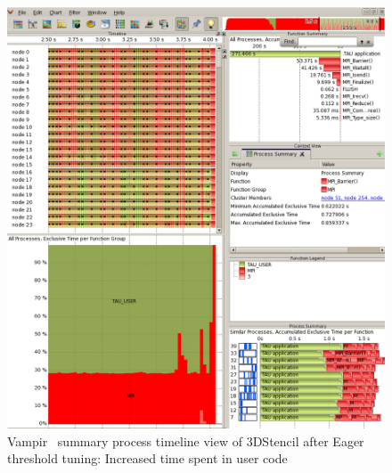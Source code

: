  \begin{figure}[tbp!]
  \centering
  \captionsetup{justification=centering}
  \includegraphics[scale=1.0,width=\columnwidth,keepaspectratio]{figures/Overlap-after}
         \caption{Vampir~\cite{Vampir} summary process timeline view of 3DStencil after Eager threshold tuning: Increased time spent in user code}
 \label{fig:aftereager}
 \end{figure}


